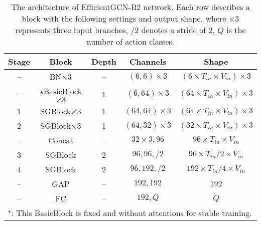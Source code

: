 \documentclass[10pt,journal,compsoc]{IEEEtran}
\begin{document}
\begin{table}[ht]
  \vspace{-0.4cm}
  \caption{The architecture of EfficientGCN-B2 network. Each row describes a block with the following settings and output shape, where $\times3$ represents three input branches, $/2$ denotes a stride of 2, $Q$ is the number of action classes.}
  \label{tab:architecture2}
  \vspace{-0.4cm}
  \centering
  \setlength{\tabcolsep}{4pt}
  \renewcommand{\arraystretch}{1.2}
  \begin{tabular}{ccccc}
  \toprule
  Stage & Block & Depth & Channels & Shape \\
  \midrule
  -- & BN$\times3$ & -- & $(6,6)\times3$ & $(6\times T_{in}\times V_{in})\times3$ \\
  -- & $\star$BasicBlock$\times3$ & 1 & $(6,64)\times3$ & $(64\times T_{in}\times V_{in})\times3$ \\
  \hline
  1 & SGBlock$\times3$ & 1 & $(64,64)\times3$ & $(64\times T_{in}\times V_{in})\times3$ \\
  2 & SGBlock$\times3$ & 1 & $(64,32)\times3$ & $(32\times T_{in}\times V_{in})\times3$ \\
  \hline
  -- & Concat & -- & $32\times3, 96$ & $96\times T_{in}\times V_{in}$ \\
  \hline
  3 & SGBlock & 2 & $96,96,/2$ & $96\times T_{in}/2\times V_{in}$ \\
  4 & SGBlock & 2 & $96,192,/2$ & $192\times T_{in}/4\times V_{in}$ \\
  \hline
  -- & GAP & -- & $192,192$ & $192$ \\
  \hline
  -- & FC & -- & $192,Q$ & $Q$ \\
  \bottomrule
  \multicolumn{5}{l}{$^\star$: This BasicBlock is fixed and without attentions for stable training.}\\
  \end{tabular}
\end{table}
\end{document}
